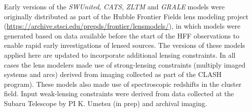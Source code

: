 Early versions of the {\it SWUnited}, {\it CATS}, {\it ZLTM} and {\it
  GRALE} models were originally distributed as part of the Hubble
Frontier Fields lens modeling project
(\url{https://archive.stsci.edu/prepds/frontier/lensmodels/}), in
which models were generated based on data available before the start
of the HFF observations to enable rapid early investigations of lensed
sources. The versions of these models applied here are updated to
incorporate additional lensing constraints.  In all cases the lens
modelers made use of strong-lensing constraints (multiply imaged
systems and arcs) derived from \HST imaging collected as part of the
CLASH program\cite{Postman:2012}). These
models also made use of spectroscopic redshifts in the cluster
field\cite{Mann:2012, Christensen:2012, Grillo:2015, Caminha:2017}.
Input weak-lensing constraints were derived from data collected at the
Subaru Telescope by PI K. Umetsu (in prep) and archival imaging.


